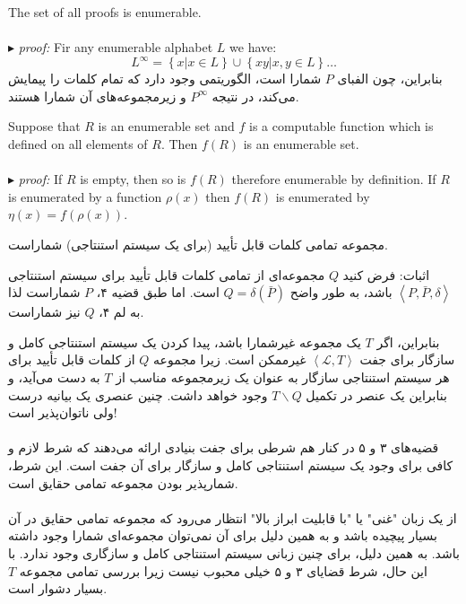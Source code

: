\documentclass[10pt,a4paper]{article}
\newcounter{theo}
\newcommand{\curveL}{\mathcal{L}}
\newcommand{\proof}{\\ \ \\ $\blacktriangleright$ \textit{proof: }}
\begin{document}
                        \begin{theorem}
                            The set of all proofs is enumerable.
                            \proof Fir any enumerable alphabet $L$ we have:
                            \begin{equation}
                                L^\infty = \left\{x | x\in L\right\} \cup \left\{xy|x,y\in L\right\}\dots
                            \end{equation}
بنابراین، چون الفبای $P$ شمارا است، الگوریتمی وجود دارد که تمام کلمات را پیمایش می‌کند، در نتیجه $P^\infty$ و زیرمجموعه‌های آن شمارا هستند.
                        \end{theorem}
                        \begin{lemma}
                            Suppose that $R$ is an enumerable set and $f$ is a computable function which is defined on all elements of $R$. Then $f(R)$ is an enumerable set.
                            \proof If $R$ is empty, then so is $f(R)$ therefore enumerable by definition. If $R$ is enumerated by a function $\rho(x)$ then $f(R)$ is enumerated by $\eta(x) = f(\rho(x))$.
                        \end{lemma}
                        \begin{theorem}
مجموعه تمامی کلمات قابل تأیید (برای یک سیستم استنتاجی) شماراست. 

اثبات: فرض کنید $Q$ مجموعه‌ای از تمامی کلمات قابل تأیید برای سیستم استنتاجی $\left<P, \bar P, \delta\right>$ باشد، به طور واضح $Q = \delta(\bar P)$ است. اما طبق قضیه ۴، $P$ شماراست لذا به لم ۴، $Q$ نیز شماراست.
                        \end{theorem}
بنابراین، اگر $T$ یک مجموعه غیرشمارا باشد، پیدا کردن یک سیستم استنتاجی کامل و سازگار برای جفت $\left< \curveL,T\right>$ غیرممکن است. زیرا مجموعه $Q$ از کلمات قابل تأیید برای هر سیستم استنتاجی سازگار به عنوان یک زیرمجموعه مناسب از $T$ به دست می‌آید، و بنابراین یک عنصر در تکمیل $T\backslash Q$ وجود خواهد داشت. چنین عنصری یک بیانیه درست ولی ناتوان‌پذیر است!
                        \\
                        \\
قضیه‌های ۳ و ۵ در کنار هم شرطی برای جفت بنیادی ارائه می‌دهند که شرط لازم و کافی برای وجود یک سیستم استنتاجی کامل و سازگار برای آن جفت است. این شرط، شمارپذیر بودن مجموعه تمامی حقایق است.
                        \\
                        \\
از یک زبان "غنی" یا "با قابلیت ابراز بالا" انتظار می‌رود که مجموعه تمامی حقایق در آن بسیار پیچیده باشد و به همین دلیل برای آن نمی‌توان مجموعه‌ای شمارا وجود داشته باشد. به همین دلیل، برای چنین زبانی سیستم استنتاجی کامل و سازگاری وجود ندارد. با این حال، شرط قضایای ۳ و ۵ خیلی محبوب نیست زیرا بررسی تمامی مجموعه $T$ بسیار دشوار است.
\end{document}
